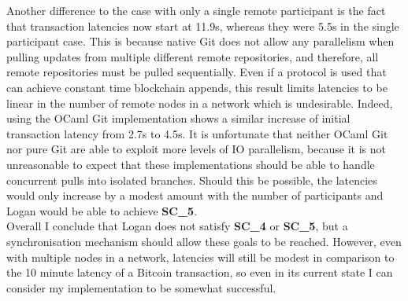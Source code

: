 \documentclass[12pt,a4paper,twoside,openright]{report}
\begin{document}
	Another difference to the case with only a single remote participant is the fact that transaction latencies now start at 11.9s, whereas they were 5.5s in the single participant case.
	This is because native Git does not allow any parallelism when pulling updates from multiple different remote repositories, and therefore, all remote repositories must be pulled sequentially.
	Even if a protocol is used that can achieve constant time blockchain appends, this result limits latencies to be linear in the number of remote nodes in a network which is undesirable. 
	Indeed, using the OCaml Git implementation shows a similar increase of initial transaction latency from 2.7s to 4.5s.
	It is unfortunate that neither OCaml Git nor pure Git are able to exploit more levels of IO parallelism, because it is not unreasonable to expect that these implementations should be able to handle concurrent pulls into isolated branches. 
	Should this be possible, the latencies would only increase by a modest amount with the number of participants and Logan would be able to achieve \textbf{SC\_5}. \\

	Overall I conclude that Logan does not satisfy \textbf{SC\_4} or \textbf{SC\_5}, but a synchronisation mechanism should allow these goals to be reached. 
	However, even with multiple nodes in a network, latencies will still be modest in comparison to the 10 minute latency of a Bitcoin transaction, so even in its current state I can consider my implementation to be somewhat successful.
\end{document}
